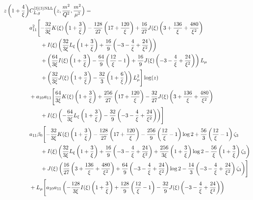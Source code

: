 \documentclass[a4paper]{article}
\begin{document}
\begin{equation}
	\begin{split}
		z \left(1 + \frac{4}{\xi}\right) &C_{L,g}^{[3](3) \rm NLL}\Bigl(z,\frac{m^2}{Q^2},\frac{m^2}{\mu^2}\Bigr)= \\
		& a_{11}^2 \Biggl[ -\frac{32}{3 \xi} K(\xi) \left(1 + \frac{3}{\xi}\right) - \frac{128}{27} \left(17 + \frac{120}{\xi}\right) + \frac{16}{27} J(\xi) \left(3 + \frac{136}{\xi} + \frac{480}{\xi^2}\right) \\
		&\qquad + I(\xi) \left(\frac{32}{3\xi} L_\xi \left(1 + \frac{3}{\xi}\right) + \frac{16}{9} \left(-3 - \frac{4}{\xi} + \frac{24}{\xi^2}\right)\right) \\
	 	& \qquad + \left(\frac{64}{3\xi} I(\xi) \left(1 + \frac{3}{\xi}\right) - \frac{64}{9} \left(\frac{12}{\xi} - 1\right) + \frac{16}{9} J(\xi) \left(-3 - \frac{4}{\xi} + \frac{24}{\xi^2}\right)\right) L_\mu \\
		& \qquad + \left(\frac{32}{3\xi} J(\xi) \left(1 + \frac{3}{\xi}\right) - \frac{32}{3} \left(1 + \frac{6}{\xi}\right)\right) L_\mu^2\Biggr] \log(z) \\
		& + a_{10} a_{11} \Biggl[ \frac{64}{3\xi} K(\xi) \left(1 + \frac{3}{\xi}\right) + \frac{256}{27} \left(17 + \frac{120}{\xi}\right) - \frac{32}{27} J(\xi) \left(3 + \frac{136}{\xi} + \frac{480}{\xi^2} \right) \\
		& \qquad + I(\xi) \left(-\frac{64}{3\xi} L_\xi \left(1 + \frac{3}{\xi}\right) - \frac{32}{9} \left(-3 - \frac{4}{\xi} + \frac{24}{\xi^2}\right)\right)\Biggr] \\
		& a_{11} \beta_0 \Biggl[-\frac{32}{3\xi} K(\xi) \left(1 + \frac{3}{\xi}\right) - \frac{128}{27} \left(17 + \frac{120}{\xi}\right) -	\frac{256}{9} \left(\frac{12}{\xi} - 1\right) \log 2 + \frac{56}{3} \left(\frac{12}{\xi} - 1\right) \zeta_3 \\
		& \qquad + I(\xi) \left(\frac{32}{3\xi} L_\xi \left(1 + \frac{3}{\xi}\right) + \frac{16}{9} \left(-3 - \frac{4}{\xi} + \frac{24}{\xi^2}\right) + \frac{256}{3\xi} \left(1 + \frac{3}{\xi}\right) \log 2 - \frac{56}{\xi} \left(1 + \frac{3}{\xi}\right) \zeta_3\right) \\
		& \qquad + J(\xi) \left( \frac{16}{27} \left(3 + \frac{136}{\xi} + \frac{480}{\xi^2}\right) + \frac{64}{9} \left(-3 - \frac{4}{\xi} + \frac{24}{\xi^2}\right) \log 2 - \frac{14}{3} \left(-3 - \frac{4}{\xi} + \frac{24}{\xi^2}\right) \zeta_3\right)\Biggr] \\
		& + L_\mu \Biggl[ a_{10} a_{11} \left(-\frac{128}{3\xi} I(\xi) \left(1 + \frac{3}{\xi}\right) + \frac{128}{9} \left(\frac{12}{\xi} - 1\right) - \frac{32}{9} J(\xi) \left(-3 - \frac{4}{\xi} + \frac{24}{\xi^2}\right)\right) \\

\end{split}
\end{equation}
\end{document}
